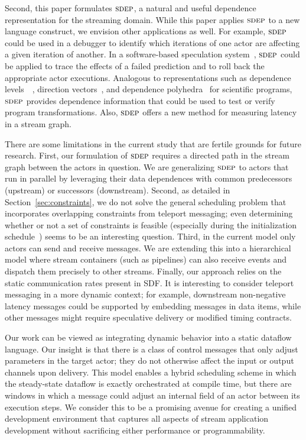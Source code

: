 \documentclass{sig-alternate}
\begin{document}

Second, this paper formulates $\textsc{sdep}$, a natural and useful dependence
representation for the streaming domain.  While this paper applies
$\textsc{sdep}$ to a new language construct, we envision other applications as
well.  For example, $\textsc{sdep}$ could be used in a debugger to identify
which iterations of one actor are affecting a given iteration of
another.  In a software-based speculation system~\cite{frank-thesis},
$\textsc{sdep}$ could be applied to trace the effects of a failed prediction
and to roll back the appropriate actor executions.  Analogous to
representations such as dependence levels~~\cite{AK82}, direction
vectors~\cite{wolfe82}, and dependence polyhedra~\cite{Irig88} for
scientific programs, $\textsc{sdep}$ provides dependence information that
could be used to test or verify program transformations.  Also,
$\textsc{sdep}$ offers a new method for measuring latency in a stream graph.

There are some limitations in the current study that are fertile
grounds for future research.  First, our formulation of $\textsc{sdep}$
requires a directed path in the stream graph between the actors in
question.  We are generalizing $\textsc{sdep}$ to actors that run in parallel
by leveraging their data dependences with common predecessors
(upstream) or successors (downstream).  Second, as detailed in
Section~\ref{sec:constraints}, we do not solve the general scheduling
problem that incorporates overlapping constraints from teleport
messaging; even determining whether or not a set of constraints is
feasible (especially during the initialization
schedule~\cite{karczma-thesis}) seems to be an interesting question.
Third, in the current model only actors can send and receive messages.
We are extending this into a hierarchical model where stream
containers (such as pipelines) can also receive events and dispatch
them precisely to other streams.  Finally, our approach relies on the
static communication rates present in SDF.  It is interesting to
consider teleport messaging in a more dynamic context; for example,
downstream non-negative latency messages could be supported by
embedding messages in data items, while other messages might require
speculative delivery or modified timing contracts.

Our work can be viewed as integrating dynamic behavior into a static
dataflow language.  Our insight is that there is a class of control
messages that only adjust parameters in the target actor; they do not
otherwise affect the input or output channels upon delivery.  This
model enables a hybrid scheduling scheme in which the steady-state
dataflow is exactly orchestrated at compile time, but there are
windows in which a message could adjust an internal field of an actor
between its execution steps.  We consider this to be a promising
avenue for creating a unified development environment that captures
all aspects of stream application development without sacrificing
either performance or programmability.\vspace{-2pt}
\end{document}
